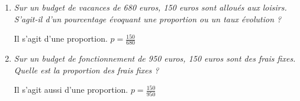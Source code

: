 
\begin{enumerate}
\item \textit{Sur un budget de vacances de 680 euros, 150 euros sont alloués aux loisirs. S'agit-il d'un pourcentage évoquant une proportion ou un taux évolution ?}

Il s'agit d'une proportion. $p=\frac{150}{680}$
\item \textit{Sur un budget de fonctionnement de 950 euros, 150 euros sont des frais fixes. Quelle est la proportion des frais fixes ? } 

Il s'agit aussi d'une proportion. $p=\frac{150}{950}$
\end{enumerate}
